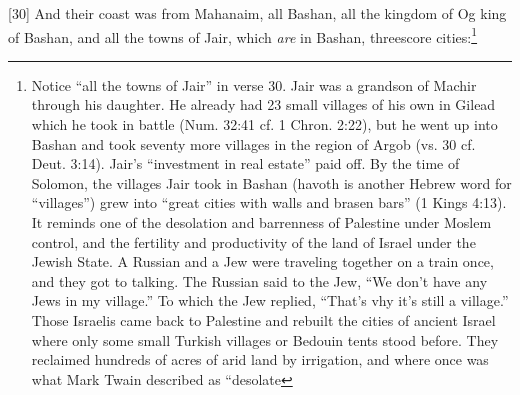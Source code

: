 [30] \textcolor[rgb]{0.00,0.00,1.00}{And their coast was from Mahanaim, all Bashan, all the kingdom of Og king of Bashan, and all the towns of Jair, which \emph{are} in Bashan, threescore cities:}\footnote{Notice “all the towns of Jair” in verse 30.
Jair was a grandson of Machir through his
daughter. He already had 23 small villages of
his own in Gilead which he took in battle (Num.
32:41 cf. 1 Chron. 2:22), but he went up into
Bashan and took seventy more villages in the
region of Argob (vs. 30 cf. Deut. 3:14). Jair’s
“investment in real estate” paid off. By the time
of Solomon, the villages Jair took in Bashan
(havoth is another Hebrew word for “villages”)
grew into “great cities with walls and brasen
bars” (1 Kings 4:13).
It reminds one of the desolation and
barrenness of Palestine under Moslem control,
and the fertility and productivity of the land of
Israel under the Jewish State. A Russian and a
Jew were traveling together on a train once, and
they got to talking. The Russian said to the Jew,
“We don’t have any Jews in my village.” To
which the Jew replied, “That’s vhy it’s still a
village.”
Those Israelis came back to Palestine and
rebuilt the cities of ancient Israel where only
some small Turkish villages or Bedouin tents
stood before. They reclaimed hundreds of acres
of arid land by irrigation, and where once was
what Mark Twain described as “desolate
}
